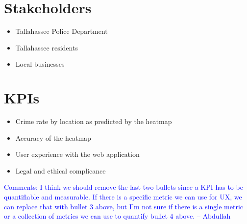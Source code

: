\documentclass[10pt]{article}
\begin{document}
\section{Stakeholders}
\begin{itemize}
    \item Tallahassee Police Department
    \item Tallahassee residents
    \item Local businesses
\end{itemize}


\section{KPIs}
\begin{itemize}
    \item Crime rate by location as predicted by the heatmap
    \item Accuracy of the heatmap
    \item User experience with the web application
    \item Legal and ethical complicance
\end{itemize}

\textcolor{blue}{Comments: I think we should remove the last two bullets since a KPI has to be quantifiable and measurable. If there is a specific metric we can use for UX, we can replace that with bullet 3 above, but I'm not sure if there is a single metric or a collection of metrics we can use to quantify bullet 4 above. -- Abdullah}
\end{document}
